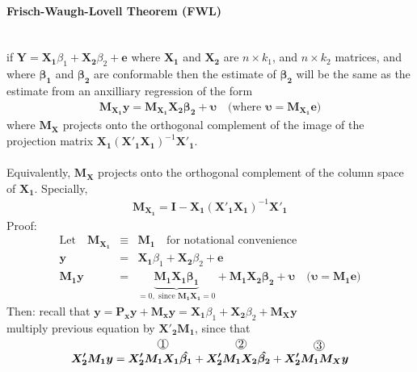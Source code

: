 \paragraph{Frisch-Waugh-Lovell Theorem (FWL)} ~\\
if $\boldsymbol{Y}=\boldsymbol{X_{1}}\beta_{1}+\boldsymbol{X_{2}}\beta_{2}+\boldsymbol{e}$ where $\boldsymbol{X_{1}}$ and $\boldsymbol{X_{2}}$ are $n \times k_{1}$, and $n \times k_{2}$ matrices, and where $\boldsymbol{\beta_{1}}$ and $\boldsymbol{\beta_{2}}$ are conformable then the estimate of $\boldsymbol{\beta_{2}}$ will be the same as the estimate from an anxilliary regression of the form
\begin{eqnarray}
\boldsymbol{M_{X_{1}}y}=\boldsymbol{M_{X_{1}}X_{2}\beta_{2}}+\boldsymbol{\upsilon}\quad\text{(where }\boldsymbol{\upsilon}=\boldsymbol{M_{X_{1}}e}\text{)}
\end{eqnarray}
where $\boldsymbol{M_{X}}$ projects onto the orthogonal complement of the image of the projection matrix $\boldsymbol{X_{1}}(\boldsymbol{X'_{1}X_{1}})^{-1}\boldsymbol{X'_{1}}$.\\
\\
Equivalently, $\boldsymbol{M_{X}}$ projects onto the orthogonal complement of the column space of $\boldsymbol{X_{1}}$. Specially,
\begin{eqnarray}
\boldsymbol{M_{X_{1}}}=\boldsymbol{I}-\boldsymbol{X_{1}}(\boldsymbol{X'_{1}X_{1}})^{-1}\boldsymbol{X'_{1}}
\end{eqnarray}
Proof:
\begin{eqnarray*}
\text{Let}\quad\boldsymbol{M_{X_{1}}}&\equiv&\boldsymbol{M_{1}}\quad\text{for notational convenience}\\
\boldsymbol{y} &=& \boldsymbol{X_{1}}\beta_{1}+\boldsymbol{X_{2}}\beta_{2}+\boldsymbol{e}\\
\boldsymbol{M_{1}y} &=& \underbrace{\boldsymbol{M_{1}X_{1}\beta_{1}}}_{=0,\text{ since }\boldsymbol{M_{1}X_{1}}=0}+\boldsymbol{M_{1}X_{2}\beta_{2}}+\boldsymbol{\upsilon}\quad\text{(}\boldsymbol{\upsilon}=\boldsymbol{M_{1}e}\text{)}
\end{eqnarray*}
Then: recall that $\boldsymbol{y}=\boldsymbol{P_{x}y}+\boldsymbol{M_{x}y}=\boldsymbol{X_{1}}\beta_{1}+\boldsymbol{X_{2}}\beta_{2}+\boldsymbol{M_{X}y}$\\
multiply previous equation by $\boldsymbol{X'_{2}M_{1}}$, since that
\begin{eqnarray*}
\boldsymbol{X'_{2}M_{1}y}=\overset{\begin{tikzpicture} \node[draw,circle,inner sep=0.4pt]{1};
\end{tikzpicture}}{\boldsymbol{X'_{2}M_{1}X_{1}\hat{\beta_{1}}}}+\overset{\begin{tikzpicture} \node[draw,circle,inner sep=0.4pt]{2};
\end{tikzpicture}}{\boldsymbol{X'_{2}M_{1}X_{2}\hat{\beta_{2}}}}+\overset{\begin{tikzpicture} \node[draw,circle,inner sep=0.4pt]{3};
\end{tikzpicture}}{\boldsymbol{X'_{2}M_{1}M_{X}y}}
\end{eqnarray*}
